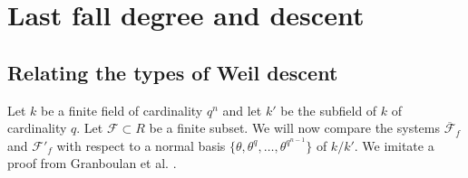 \documentclass{amsart}
\theoremstyle{plain}
\theoremstyle{definition}
\begin{document}
\section{Last fall degree and descent} \label{303}

\subsection{Relating the types of Weil descent}

Let $k$ be a finite field of cardinality $q^n$ and let $k'$ be the subfield of $k$ of cardinality $q$. Let $\mathcal{F} \subset R$ be a finite subset. We will now compare the systems $\overline{\mathcal{F}}_f$ and $\mathcal{F}'_f$ with respect to a normal basis $\{\theta, \theta^q,\ldots,\theta^{q^{n-1}}\}$ of $k/k'$. We imitate a proof from Granboulan et al. \cite[Section 4.2]{GRA}.
\end{document}
